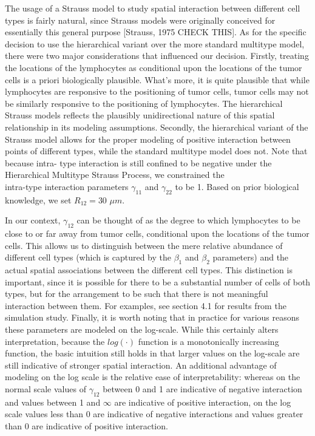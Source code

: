 \documentclass[
]{book}
\begin{document}
The usage of a Strauss model to study spatial interaction between
different cell types is fairly natural, since Strauss models were
originally conceived for essentially this general purpose {[}Strauss,
1975 CHECK THIS{]}. As for the specific decision to use the hierarchical
variant over the more standard multitype model, there were two major
considerations that influenced our decision. Firstly, treating the
locations of the lymphocytes as conditional upon the locations of the
tumor cells is a priori biologically plausible. What's more, it is quite
plausible that while lymphocytes are responsive to the positioning of
tumor cells, tumor cells may not be similarly responsive to the
positioning of lymphocytes. The hierarchical Strauss models reflects the
plausibly unidirectional nature of this spatial relationship in its
modeling assumptions. Secondly, the hierarchical variant of the Strauss
model allows for the proper modeling of positive interaction between
points of different types, while the standard multitype model does not.
Note that because intra- type interaction is still confined to be
negative under the\\
Hierarchical Multitype Strauss Process, we constrained the\\
intra-type interaction parameters \(\gamma_{11}\) and \(\gamma_{22}\) to be
1. Based on prior biological knowledge, we set \(R_{12} = 30\) \(\mu m\).

In our context, \(\gamma_{12}\) can be thought of as the degree to which
lymphocytes to be close to or far away from tumor cells, conditional
upon the locations of the tumor cells. This allows us to distinguish
between the mere relative abundance of different cell types (which is
captured by the \(\beta_1\) and \(\beta_2\) parameters) and the actual
spatial associations between the different cell types. This distinction
is important, since it is possible for there to be a substantial number
of cells of both types, but for the arrangement to be such that there is
not meaningful interaction between them. For examples, see section 4.1
for results from the simulation study. Finally, it is worth noting that
in practice for various reasons these parameters are modeled on the
log-scale. While this certainly alters interpretation, because the
\(log(\cdot)\) function is a monotonically increasing function, the basic
intuition still holds in that larger values on the log-scale are still
indicative of stronger spatial interaction. An additional advantage of
modeling on the log scale is the relative ease of interpretability:
whereas on the normal scale values of \(\gamma_{12}\) between 0 and 1 are
indicative of negative interaction and values between 1 and \(\infty\) are
indicative of positive interaction, on the log scale values less than 0
are indicative of negative interactions and values greater than 0 are
indicative of positive interaction.
\end{document}
